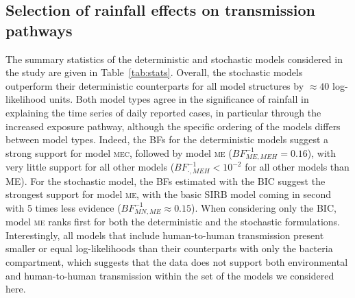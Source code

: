 \subsection{Selection of rainfall effects on transmission pathways}
The summary statistics of the deterministic and stochastic models considered in the study are given in Table~\ref{tab:stats}. Overall, the stochastic models outperform their deterministic counterparts for all model structures by $\approx 40$ log-likelihood units. Both model types agree in the significance of rainfall in explaining the time series of daily reported cases, in particular through the increased exposure pathway, although the specific ordering of the models differs between model types. Indeed, the BFs for the deterministic models suggest a strong support for model \textsc{mec}, followed by model \textsc{me} ($BF^{-1}_{ME,MEH} = 0.16$), with very little support for all other models ($BF^{-1}_{\boldsymbol{\cdot},MEH}< 10^{-2}$ for all other models than ME). For the stochastic model, the BFs estimated with the BIC suggest the strongest support for model \textsc{me}, with the basic SIRB model coming in second with 5 times less evidence ($BF^{-1}_{MN,ME} \approx 0.15$). When considering only the BIC, model \textsc{me} ranks first for both the deterministic and the stochastic formulations. Interestingly, all models that include human-to-human transmission present smaller or equal log-likelihoods than their counterparts with only the bacteria compartment, which suggests that the data does not support both environmental and human-to-human transmission within the set of the models we considered here.

